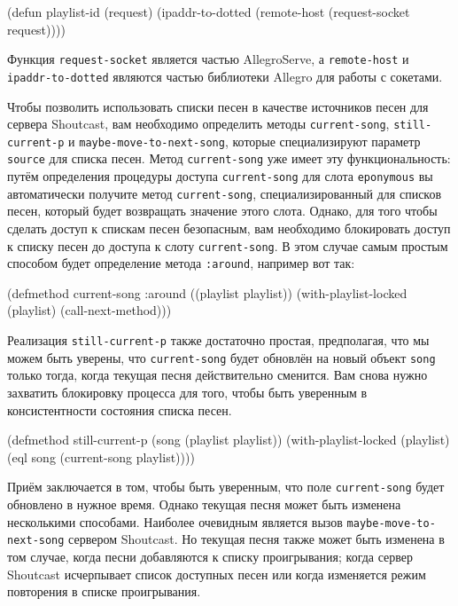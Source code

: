 \begin{myverb}
(defun playlist-id (request)
  (ipaddr-to-dotted (remote-host (request-socket request))))
\end{myverb}

Функция \lstinline{request-socket} является частью AllegroServe, а \lstinline{remote-host} и
\lstinline{ipaddr-to-dotted} являются частью библиотеки Allegro для работы с сокетами.

Чтобы позволить использовать списки песен в качестве источников песен для сервера
Shoutcast, вам необходимо определить методы \lstinline{current-song}, \lstinline{still-current-p} и
\lstinline{maybe-move-to-next-song}, которые специализируют параметр \lstinline{source} для списка
песен. Метод \lstinline{current-song} уже имеет эту функциональность: путём определения
процедуры доступа \lstinline{current-song} для слота \lstinline{eponymous} вы автоматически
получите метод \lstinline{current-song}, специализированный для списков песен, который будет
возвращать значение этого слота. Однако, для того чтобы сделать доступ к спискам песен
безопасным, вам необходимо блокировать доступ к списку песен до доступа к слоту
\lstinline{current-song}.  В этом случае самым простым способом будет определение метода
\lstinline{:around}, например вот так:

\begin{myverb}
(defmethod current-song :around ((playlist playlist))
  (with-playlist-locked (playlist) (call-next-method)))
\end{myverb}

Реализация \lstinline{still-current-p} также достаточно простая, предполагая, что мы можем быть
уверены, что \lstinline{current-song} будет обновлён на новый объект \lstinline{song} только тогда,
когда текущая песня действительно сменится.  Вам снова нужно захватить блокировку процесса
для того, чтобы быть уверенным в консистентности состояния списка песен.

\begin{myverb}
(defmethod still-current-p (song (playlist playlist))
  (with-playlist-locked (playlist)
    (eql song (current-song playlist))))
\end{myverb}

Приём заключается в том, чтобы быть уверенным, что поле \lstinline{current-song} будет
обновлено в нужное время.  Однако текущая песня может быть изменена несколькими
способами.  Наиболее очевидным является вызов \lstinline{maybe-move-to-next-song} сервером
Shoutcast.  Но текущая песня также может быть изменена в том случае, когда песни
добавляются к списку проигрывания; когда сервер Shoutcast исчерпывает список доступных
песен или когда изменяется режим повторения в списке проигрывания.

